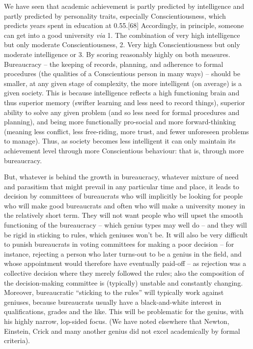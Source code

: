 \documentclass[
]{book}
\begin{document}
We have seen that academic achievement is partly predicted by intelligence and partly predicted by personality traits, especially Conscientiousness, which predicts years spent in education at 0.55.{[}68{]} Accordingly, in principle, someone can get into a good university \emph{via} 1. The combination of very high intelligence but only moderate Conscientiousness, 2. Very high Conscientiousness but only moderate intelligence or 3. By scoring reasonably highly on both measures. Bureaucracy -- the keeping of records, planning, and adherence to formal procedures (the qualities of a Conscientious person in many ways) -- should be smaller, at any given stage of complexity, the more intelligent (on average) is a given society. This is because intelligence reflects a high functioning brain and thus superior memory (swifter learning and less need to record things), superior ability to solve any given problem (and so less need for formal procedures and planning), and being more functionally pro-social and more forward-thinking (meaning less conflict, less free-riding, more trust, and fewer unforeseen problems to manage). Thus, as society becomes less intelligent it can only maintain its achievement level through more Conscientious behaviour: that is, through more bureaucracy.

But, whatever is behind the growth in bureaucracy, whatever mixture of need and parasitism that might prevail in any particular time and place, it leads to decision by committees of bureaucrats who will implicitly be looking for people who will make good bureaucrats and often who will make a university money in the relatively short term. They will not want people who will upset the smooth functioning of the bureaucracy -- which genius types may well do -- and they will be rigid in sticking to rules, which geniuses won't be. It will also be very difficult to punish bureaucrats in voting committees for making a poor decision -- for instance, rejecting a person who later turns-out to be a genius in the field, and whose appointment would therefore have eventually paid-off -- as rejection was a collective decision where they merely followed the rules; also the composition of the decision-making committee is (typically) unstable and constantly changing. Moreover, bureaucratic ``sticking to the rules'' will typically work against geniuses, because bureaucrats usually have a black-and-white interest in qualifications, grades and the like. This will be problematic for the genius, with his highly narrow, lop-sided focus. (We have noted elsewhere that Newton, Einstein, Crick and many another genius did not excel academically by formal criteria).
\end{document}
